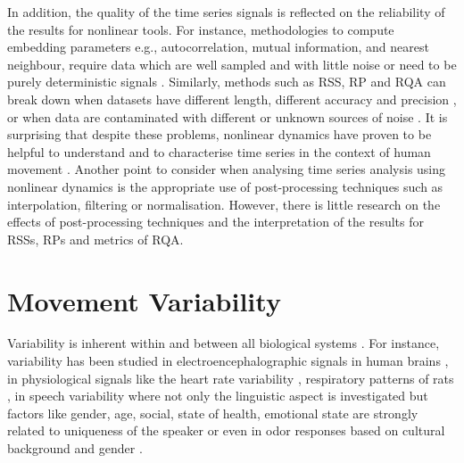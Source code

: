 In addition, the quality of the time series signals is reflected on 
the reliability of the results for nonlinear tools. For instance, 
methodologies to compute embedding 
parameters e.g., autocorrelation, mutual information, and nearest neighbour,
require data which are well sampled and with little noise \citep{garland2016} 
or need to be purely deterministic signals \citep{kantz2003}.
Similarly, methods such as RSS, RP and RQA can break down when 
datasets have different length, different accuracy and 
precision \citep{frank2010},
or when data are contaminated with different or unknown sources of noise 
\citep{garland2016}. It is surprising that despite these problems,
nonlinear dynamics have proven to be helpful to understand and 
to characterise time series in the context of human movement 
\citep{Quintana-Duque2012, Quintana-Duque2016, sama2013, frank2010,
gomezgarcia2014, marwan2011, stergiou2011, bradley2015}.
Another point to consider when analysing time series analysis using 
nonlinear dynamics is the appropriate use of post-processing techniques 
such as interpolation, filtering or normalisation.
However, there is little research on the effects of post-processing 
techniques and the interpretation of the results for RSSs, RPs and 
metrics of RQA.



\section{Movement Variability}
Variability is inherent within and between all biological 
systems \citep{newell1993}.
For instance, variability has been studied in electroencephalographic 
signals in human brains \citep{klonowski2007}, in physiological signals 
like the heart rate variability \citep{schumacher2004, acharya2006}, 
respiratory patterns of rats \citep{dhingra2011}, in speech variability 
where not only the linguistic aspect is investigated but 
factors like gender, age, social, state of health, emotional state are
strongly related to uniqueness of the speaker \citep{benzeghiba2007}
or even in odor responses based on cultural background and 
gender \citep{ferdenzi2013}.

